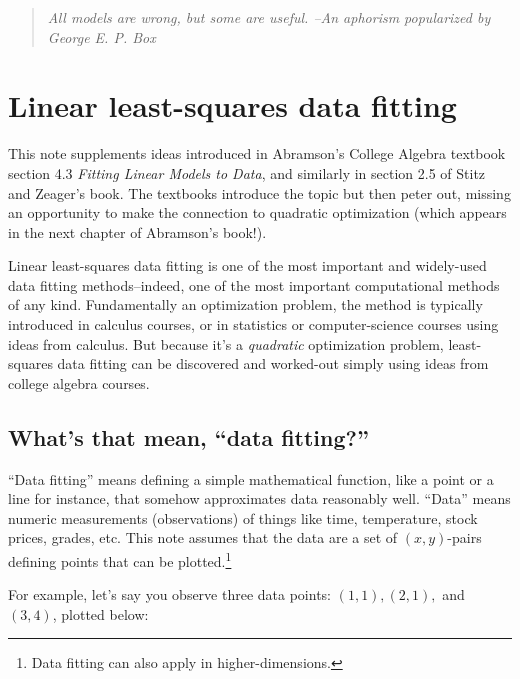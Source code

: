 \documentclass[10pt]{article}
\begin{document}
\begin{quote}
{\it All models are wrong, but some are useful.  --An aphorism popularized by George E. P. Box}
\end{quote}

\section*{Linear least-squares data fitting}

This note supplements ideas introduced in Abramson's College Algebra textbook
section 4.3 {\it Fitting Linear Models to Data}\cite{ab}, and similarly in
section 2.5 of Stitz and Zeager's book\cite{sz}. The textbooks introduce the
topic but then peter out, missing an opportunity to make the connection to
quadratic optimization (which appears in the next chapter of Abramson's
book!).

Linear least-squares data fitting is one of the most important and widely-used
data fitting methods--indeed, one of the most important computational methods
of any kind. Fundamentally an optimization problem, the method is typically
introduced in calculus courses, or in statistics or computer-science courses
using ideas from calculus. But because it's a {\it quadratic} optimization
problem, least-squares data fitting can be discovered and worked-out simply
using ideas from college algebra courses.


\subsection*{What's that mean, ``data fitting?''}

``Data fitting'' means defining a simple mathematical function, like a point or
a line for instance, that somehow approximates data reasonably well.  ``Data''
means numeric measurements (observations) of things like time, temperature,
stock prices, grades, etc. This note assumes that the data are a set of $(x,y)$-pairs
defining points that can be plotted.\footnote{Data fitting can also apply
in higher-dimensions.}

For example, let's say you observe three data points: $(1,1), (2,1),$ and
$(3,4)$, plotted below:
\end{document}
